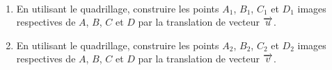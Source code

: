 \documentclass[11pt]{article}
\begin{document}
\begin{exo}~\\
  \begin{minipage}[]{.35\textwidth}
    \begin{enumerate}
      \item En utilisant le quadrillage, construire les points $A_1$, $B_1$,
        $C_1$ et $D_1$ images respectives de $A$, $B$, $C$ et $D$ par la
        translation de vecteur $\overrightarrow{u}$.
      \item En utilisant le quadrillage, construire les points $A_2$, $B_2$,
        $C_2$ et $D_2$ images respectives de $A$, $B$, $C$ et $D$ par la
        translation de vecteur $\overrightarrow{v}$.
    \end{enumerate}
  \end{minipage}
  \begin{minipage}[]{.65\textwidth}
    \begin{center}
    \end{center}
  \end{minipage}
\end{exo}
\end{document}
